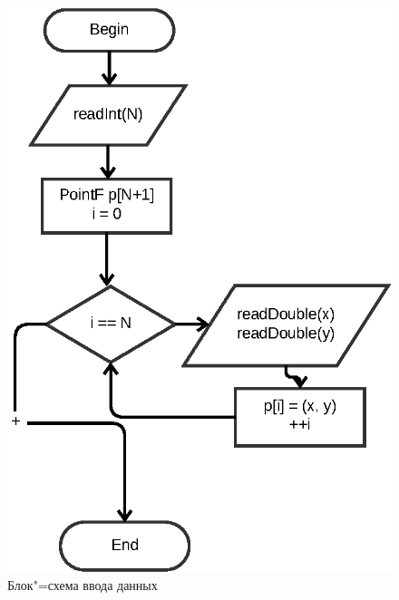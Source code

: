 \documentclass[a4paper,12pt,notitlepage,headsepline,pdftex]{scrartcl}
\begin{document}
    \begin{figure}[h]
      \begin{center}
        \includegraphics{input.eps}
      \end{center}
      \caption{Блок"=схема ввода данных}
      \label{fig:input}
    \end{figure}
\end{document}
